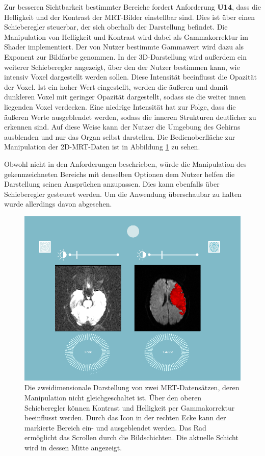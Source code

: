 Zur besseren Sichtbarkeit bestimmter Bereiche fordert Anforderung \textbf{U14}, dass die Helligkeit und der Kontrast der MRT-Bilder einstellbar sind. Dies ist über einen Schieberegler steuerbar, der sich oberhalb der Darstellung befindet. 
Die Manipulation von Helligkeit und Kontrast wird dabei als Gammakorrektur im Shader implementiert. Der von Nutzer bestimmte Gammawert wird dazu als Exponent zur Bildfarbe genommen. 
In der 3D-Darstellung wird außerdem ein weiterer Schieberegler angezeigt, über den der Nutzer bestimmen kann, wie intensiv Voxel dargestellt werden sollen. Diese Intensität beeinflusst die Opazität der Voxel. Ist ein hoher Wert eingestellt, werden die äußeren und damit dunkleren Voxel mit geringer Opazität dargestellt, sodass sie die weiter innen liegenden Voxel verdecken. Eine niedrige Intensität hat zur Folge, dass die äußeren Werte ausgeblendet werden, sodass die inneren Strukturen deutlicher zu erkennen sind. Auf diese Weise kann der Nutzer die Umgebung des Gehirns ausblenden und nur das Organ selbst darstellen.
Die Bedienoberfläche zur Manipulation der 2D-MRT-Daten ist in Abbildung \ref{img:mARt2d} zu sehen.

Obwohl nicht in den Anforderungen beschrieben, würde die Manipulation des gekennzeichneten Bereichs mit denselben Optionen dem Nutzer helfen die Darstellung seinen Ansprüchen anzupassen. Dies kann ebenfalls über Schieberegler gesteuert werden. Um die Anwendung überschaubar zu halten wurde allerdings davon abgesehen.


\begin{figure}[!htb]
	\centering
	\includegraphics[width=0.7\linewidth]{images/mARt2d_2.png}
	\caption{Die zweidimensionale Darstellung von zwei MRT-Datensätzen, deren Manipulation nicht gleichgeschaltet ist. Über den oberen Schieberegler können Kontrast und Helligkeit per Gammakorrektur beeinflusst werden. Durch das Icon in der rechten Ecke kann der markierte Bereich ein- und ausgeblendet werden. Das Rad ermöglicht das Scrollen durch die Bildschichten. Die aktuelle Schicht wird in dessen Mitte angezeigt. }
	\label{img:mARt2d}
\end{figure}
\FloatBarrier

